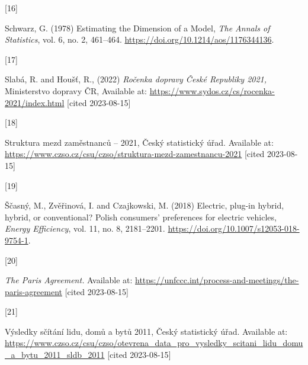 \documentclass{mmeproc}
\newlength{\cslhangindent}
\newlength{\csllabelwidth}
\newenvironment{CSLReferences}[2] %
 {%
  \setlength{\parindent}{0pt}
  \ifodd #1
  \fi
  \setlength{\parskip}{-2pt}
 }%
 {}
\newcommand{\CSLLeftMargin}[1]{\parbox[t]{\csllabelwidth}{#1}}
\newcommand{\CSLRightInline}[1]{\parbox[t]{\linewidth - \csllabelwidth}{#1}\break}
\begin{document}
\begin{CSLReferences}{0}{0}
\leavevmode{}%
\CSLLeftMargin{{[}16{]} }%
\CSLRightInline{Schwarz, G. (1978) {Estimating the {Dimension} of a
{Model},} \emph{The Annals of Statistics}, vol. 6, no. 2, 461--464.
\url{https://doi.org/10.1214/aos/1176344136}.}

\leavevmode{}%
\CSLLeftMargin{{[}17{]} }%
\CSLRightInline{Slabá, R. and Houšť, R., (2022) \emph{Ročenka dopravy {České
Republiky} 2021,} {Ministerstvo dopravy ČR}, Available at:
\url{https://www.sydos.cz/cs/rocenka-2021/index.html} {{[}cited 2023-08-15{]}}}

\leavevmode{}%
\CSLLeftMargin{{[}18{]} }%
\CSLRightInline{{Struktura mezd zaměstnanců -- 2021,} Český
statistický úřad. Available at:
\url{https://www.czso.cz/csu/czso/struktura-mezd-zamestnancu-2021} {{[}cited 2023-08-15{]}}}

\leavevmode{}%
\CSLLeftMargin{{[}19{]} }%
\CSLRightInline{Ščasný, M., Zvěřinová, I. and Czajkowski, M. (2018) {Electric,
plug-in hybrid, hybrid, or conventional? {Polish} consumers' preferences
for electric vehicles,} \emph{Energy Efficiency}, vol. 11, no. 8, 2181--2201.
\url{https://doi.org/10.1007/s12053-018-9754-1}.}

\leavevmode{}%
\CSLLeftMargin{{[}20{]} }%
\CSLRightInline{\emph{The {Paris} {Agreement}.} Available at:
\url{https://unfccc.int/process-and-meetings/the-paris-agreement} {{[}cited 2023-08-15{]}}}

\leavevmode{}%
\CSLLeftMargin{{[}21{]} }%
\CSLRightInline{{Výsledky sčítání lidu, domů a bytů 2011}, Český statistický úřad. Available at:
\url{https://www.czso.cz/csu/czso/otevrena_data_pro_vysledky_scitani_lidu_domu_a_bytu_2011_sldb_2011} {{[}cited 2023-08-15{]}}}

\end{CSLReferences}
\end{document}
